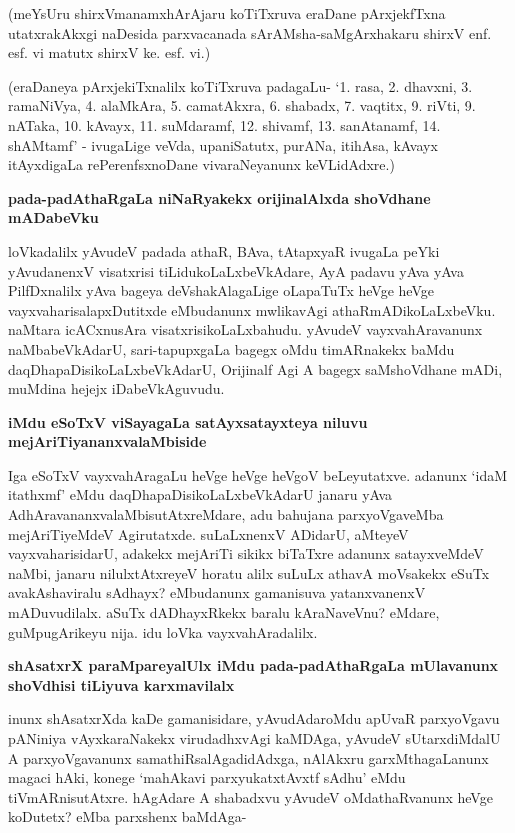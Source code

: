 \noindent
(meYsUru shirxVmanamxhArAjaru koTiTxruva eraDane pArxjekfTxna utatxrakAkxgi naDesida parxvacanada sA\-rAMsha-saMgArxhakaru shirxV enf. esf. vi matutx shirxV ke. esf. vi.)

(eraDaneya pArxjekiTxnalilx koTiTxruva padagaLu- `1. rasa, 2. dhavxni, 3. ramaNiVya, 4. alaMkAra, 5. camatAkxra, 6. shabadx, 7. vaqtitx, 9. riVti, 9. nATaka, 10. kAvayx, 11. suMdaramf, 12. shivamf, 13. sanAtanamf, 14. shAMtamf' - ivugaLige veVda, upaniSatutx, purANa, itihAsa, kAvayx itAyxdigaLa rePerenfsxnoDane vivaraNeyanunx keVLidAdxre.)

{\bigskip
\noindent
{\large\bf pada-padAthaRgaLa niNaRyakekx orijinalAlxda shoVdhane mADabeVku}}\label{page215}
\medskip

\noindent
loVkadalilx yAvudeV padada athaR, BAva, tAtapxyaR ivugaLa peYki yAvudanenxV visatxrisi tiLidu\-koLaLx\-beVkAdare, AyA padavu yAva yAva PilfDxnalilx yAva bageya deVshakAlagaLige oLapaTuTx heVge heVge vayxvaharisalapxDutitxde eMbudanunx mwlikavAgi athaRmADikoLaLxbeVku. naMtara icACxnusAra visatxrisi\-koLaLxbahudu. yAvudeV vayxvahAravanunx naMbabeVkAdarU, sari-tapupxgaLa bagegx oMdu timARnakekx baMdu daqDhapaDisikoLaLxbeVkAdarU, Orijinalf Agi A bagegx saMshoVdhane mADi, muMdina hejejx iDabeVkAgu\-vudu.

{\bigskip
\noindent
{\large\bf iMdu eSoTxV viSayagaLa satAyxsatayxteya niluvu mejAriTiyananxvalaMbiside}}\label{page215}
\medskip

\noindent
Iga eSoTxV vayxvahAragaLu heVge heVge heVgoV beLeyutatxve. adanunx `idaM itathxmf' eMdu daqDhapaDisikoLaLxbeVkAdarU janaru yAva AdhAravananxvalaMbi\-sutAtxreMdare, adu bahujana parxyoVga\-veMba mejAriTiyeMdeV Agirutatxde. suLaLxnenxV ADidarU, aMteyeV vayxvaharisidarU, adakekx mejAriTi sikikx biTaTxre adanunx satayxveMdeV naMbi, janaru nilulxtAtxreyeV horatu alilx suLuLx athavA moVsakekx eSuTx avakAshaviralu sAdhayx? eMbudanunx gamanisuva yatanxvanenxV mADuvudilalx. aSuTx dADhayxRkekx baralu kAraNaveVnu? eMdare, guMpugArikeyu nija. idu loVka vayxvahAradalilx.

{\bigskip
\noindent
{\large\bf shAsatxrX paraMpareyalUlx iMdu pada-padAthaRgaLa mUlavanunx shoVdhisi tiLiyuva karxmavilalx}}\label{page216}
\medskip

\noindent
inunx shAsatxrXda kaDe gamanisidare, yAvudAdaroMdu apUvaR parxyoVgavu pANiniya vAyxkaraNakekx virudadhxvAgi kaMDAga, yAvudeV sUtarxdiMdalU A parxyoVgavanunx samathiRsalAgadidAdxga, nAlAkxru garxMthagaLanunx magaci hAki, konege `mahAkavi parxyukatxtAvxtf sAdhu'\label{216} eMdu tiVmARnisutAtxre. hAgAdare A shabadxvu yAvudeV oMdathaRvanunx heVge koDutetx? eMba parxshenx baMdAga-

